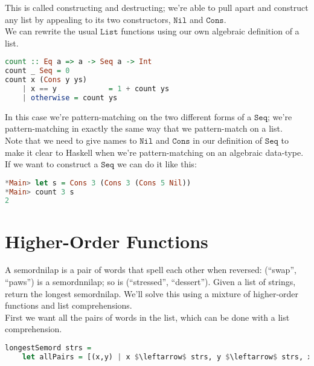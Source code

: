 \documentclass[a4paper,12pt]{article}
\newcommand{\kwa}[1]{\mathtt{#1}}
\begin{document}
\noindent
This is called constructing and destructing; we're able to pull apart and construct any list by appealing to its two constructors, $\kwa{Nil}$ and $\kwa{Cons}$.\\

\noindent
We can rewrite the usual $\kwa{List}$ functions using our own algebraic definition of a list.

\begin{lstlisting}[language=Haskell]
count :: Eq a => a -> Seq a -> Int
count _ Seq = 0
count x (Cons y ys)
	| x == y			= 1 + count ys
	| otherwise	= count ys 
\end{lstlisting}

\noindent
In this case we're pattern-matching on the two different forms of a $\kwa{Seq}$; we're pattern-matching in exactly the same way that we pattern-match on a list. \\

\noindent
Note that we need to give names to $\kwa{Nil}$ and $\kwa{Cons}$ in our definition of $\kwa{Seq}$ to make it clear to Haskell when we're pattern-matching on an algebraic data-type. \\

\noindent
If we want to construct a $\kwa{Seq}$ we can do it like this: 

\begin{lstlisting}[language=Haskell]
*Main> let s = Cons 3 (Cons 3 (Cons 5 Nil))
*Main> count 3 s
2
\end{lstlisting}

\section{Higher-Order Functions}

\noindent
A semordnilap is a pair of words that spell each other when reversed: (``swap'', ``paws'') is a semordnnilap; so is (``stressed'', ``dessert'').  Given a list of strings, return the longest semordnilap. We'll solve this using a mixture of higher-order functions and list comprehensions. \\

\noindent
First we want all the pairs of words in the list, which can be done with a list comprehension.

\begin{lstlisting}[language=Haskell]
longestSemord strs =
	let allPairs = [(x,y) | x $\leftarrow$ strs, y $\leftarrow$ strs, x /= y]
\end{lstlisting}
\end{document}
